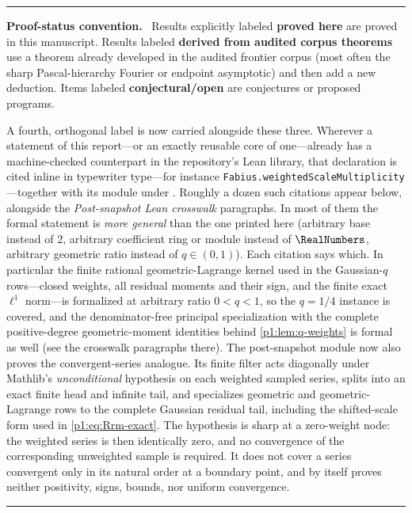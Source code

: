 \documentclass[11pt,oneside]{article}
\numberwithin{equation}{section}
\theoremstyle{definition}
\theoremstyle{remark}
\newcommand{\statusproved}{\textcolor{deepgreen}{\textbf{proved here}}}
\newcommand{\statusderived}{\textcolor{linkblue}{\textbf{derived from audited corpus theorems}}}
\newcommand{\statusopen}{\textcolor{deepred}{\textbf{conjectural/open}}}
\newcommand{\lean}[1]{%
  \ifmmode\text{\texttt{\detokenize{#1}}}\else\nolinkurl{#1}\fi}
\newenvironment{statusbox}[1]{%
  \par\medskip\noindent\begin{center}\begin{minipage}{0.94\textwidth}%
  \color{linkblue}\hrule\vspace{0.65em}%
  \color{black}\textbf{\color{linkblue}#1.}\ }{%
  \par\vspace{0.65em}\color{linkblue}\hrule
  \end{minipage}\end{center}\medskip}
\begin{document}
\begin{statusbox}{Proof-status convention}
Results explicitly labeled \statusproved{} are proved in this manuscript.  Results labeled
\statusderived{} use a theorem already developed in the audited frontier corpus (most often
the sharp Pascal-hierarchy Fourier or endpoint asymptotic) and then add a new deduction.
Items labeled \statusopen{} are conjectures or proposed programs.

A fourth, orthogonal label is now carried alongside these three.  Wherever a statement of this
report---or an exactly reusable core of one---already has a machine-checked counterpart in the
repository's Lean library, that declaration is cited inline in typewriter type---for instance
\lean{Fabius.weightedScaleMultiplicity}---together with its module under
.  Roughly a dozen such citations appear
below, alongside the \emph{Post-snapshot Lean crosswalk} paragraphs.  In most of them the
formal statement is \emph{more general} than the one printed here
(arbitrary base instead of $2$, arbitrary coefficient ring or module instead of $\RealNumbers$, arbitrary
geometric ratio instead of $q\in(0,1)$).  Each citation says which.  In particular the finite
rational geometric-Lagrange kernel used in the Gaussian-$q$ rows---closed weights, all
residual moments and their sign, and the finite exact $\ell^1$ norm---is formalized at
arbitrary ratio $0<q<1$, so the $q=1/4$ instance is covered, and the denominator-free
principal specialization with the complete positive-degree geometric-moment identities behind
\cref{p1:lem:q-weights} is formal as well (see the crosswalk paragraphs there).
The post-snapshot module  now also proves the
convergent-series analogue.  Its finite filter acts diagonally under Mathlib's
\emph{unconditional}  hypothesis on each weighted sampled series,
splits into an exact finite head and infinite tail, and specializes geometric and
geometric-Lagrange rows to the complete Gaussian residual tail, including the
shifted-scale form used in \eqref{p1:eq:Rrm-exact}.  The hypothesis is sharp at a
zero-weight node: the weighted series is then identically zero, and no convergence
of the corresponding unweighted sample is required.  It does not cover a series
convergent only in its natural order at a boundary point, and by itself proves
neither positivity, signs, bounds, nor uniform convergence.
\end{statusbox}
\end{document}
